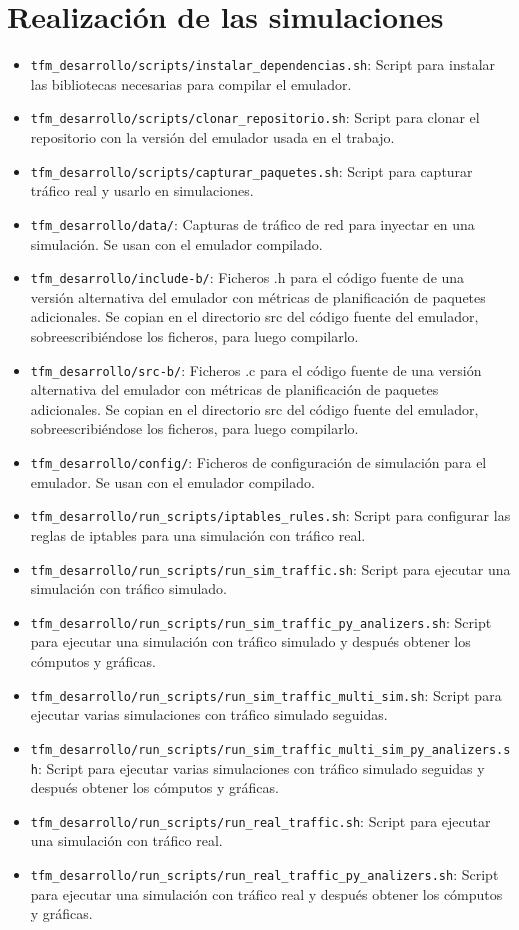 \documentclass[12pt]{report} %
\begin{document}
\section* {Realización de las simulaciones}

\begin{itemize}
\item \verb|tfm_desarrollo/scripts/instalar_dependencias.sh|: Script para instalar las bibliotecas necesarias para compilar el emulador.
\item \verb|tfm_desarrollo/scripts/clonar_repositorio.sh|: Script para clonar el repositorio con la versión del emulador usada en el trabajo.
\item \verb|tfm_desarrollo/scripts/capturar_paquetes.sh|: Script para capturar tráfico real y usarlo en simulaciones.
\item \verb|tfm_desarrollo/data/|: Capturas de tráfico de red para inyectar en una simulación. Se usan con el emulador compilado.
\item \verb|tfm_desarrollo/include-b/|: Ficheros .h para el código fuente de una versión alternativa del emulador con métricas de planificación de paquetes adicionales. Se copian en el directorio src del código fuente del emulador, sobreescribiéndose los ficheros, para luego compilarlo.
\item \verb|tfm_desarrollo/src-b/|: Ficheros .c para el código fuente de una versión alternativa del emulador con métricas de planificación de paquetes adicionales. Se copian en el directorio src del código fuente del emulador, sobreescribiéndose los ficheros, para luego compilarlo.
\item \verb|tfm_desarrollo/config/|: Ficheros de configuración de simulación para el emulador. Se usan con el emulador compilado.
\item \verb|tfm_desarrollo/run_scripts/iptables_rules.sh|: Script para configurar las reglas de iptables para una simulación con tráfico real.
\item \verb|tfm_desarrollo/run_scripts/run_sim_traffic.sh|: Script para ejecutar una simulación con tráfico simulado.
\item \verb|tfm_desarrollo/run_scripts/run_sim_traffic_py_analizers.sh|: Script para ejecutar una simulación con tráfico simulado y después obtener los cómputos y gráficas.
\item \verb|tfm_desarrollo/run_scripts/run_sim_traffic_multi_sim.sh|: Script para ejecutar varias simulaciones con tráfico simulado seguidas.
\item \verb|tfm_desarrollo/run_scripts/run_sim_traffic_multi_sim_py_analizers.sh|: Script para ejecutar varias simulaciones con tráfico simulado seguidas y después obtener los cómputos y gráficas.
\item \verb|tfm_desarrollo/run_scripts/run_real_traffic.sh|: Script para ejecutar una simulación con tráfico real.
\item \verb|tfm_desarrollo/run_scripts/run_real_traffic_py_analizers.sh|: Script para ejecutar una simulación con tráfico real y después obtener los cómputos y gráficas.
\end{itemize}
\end{document}
